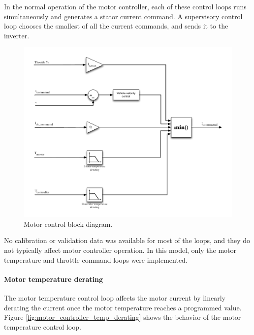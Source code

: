 \documentclass[../SimBALink.tex]{subfiles}
\begin{document}
		In the normal operation of the motor controller, each of these control loops runs simultaneously and generates a stator current command. A supervisory control loop chooses the smallest of all the current commands, and sends it to the inverter.
		
		\begin{figure}[h]
			\centering
			\includegraphics[width=\linewidth]{motor_controller_control_diagram}
			\caption{Motor control block diagram.}
			\label{fig:motor_controller_control_diagram}
		\end{figure}
		\FloatBarrier
		
		No calibration or validation data was available for most of the loops, and they do not typically affect motor controller operation. In this model, only the motor temperature and throttle command loops were implemented.
		
		\paragraph{Motor temperature derating}
			The motor temperature control loop affects the motor current by linearly derating the current once the motor temperature reaches a programmed value. Figure \ref{fig:motor_controller_temp_derating} shows the behavior of the motor temperature control loop.
			
\end{document}
